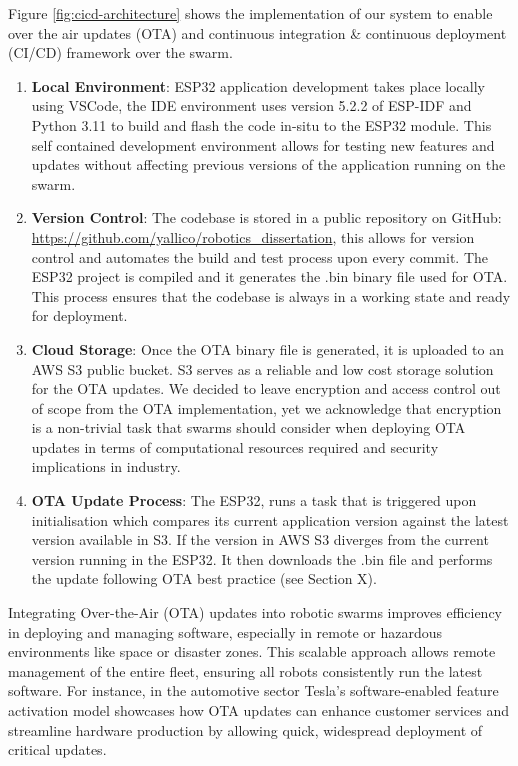 \documentclass[conference]{IEEEtran}
\begin{document}
Figure \ref{fig:cicd-architecture} shows the implementation of our system to enable over the air updates (OTA) and continuous integration \& continuous deployment (CI/CD) framework over the swarm. 
\begin{enumerate}
    \item \textbf{Local Environment}: ESP32 application development takes place locally using VSCode, the IDE environment uses version 5.2.2 of ESP-IDF and Python 3.11 to build and flash the code in-situ to the ESP32 module. This self contained development environment allows for testing new features and updates without affecting previous versions of the application running on the swarm.
    \item \textbf{Version Control}: The codebase is stored in a public repository on GitHub: \url{https://github.com/yallico/robotics_dissertation}, this allows for version control and automates the build and test process upon every commit. The ESP32 project is compiled and it generates the .bin binary file used for OTA. This process ensures that the codebase is always in a working state and ready for deployment.
    \item \textbf{Cloud Storage}: Once the OTA binary file is generated, it is uploaded to an AWS S3 public bucket. S3 serves as a reliable and low cost storage solution for the OTA updates. We decided to leave encryption and access control out of scope from the OTA implementation, yet we acknowledge that encryption is a non-trivial task that swarms should consider when deploying OTA updates in terms of computational resources required and security implications in industry. %
    \item \textbf{OTA Update Process}: The ESP32, runs a task that is triggered upon initialisation which compares its current application version against the latest version available in S3. If the version in AWS S3 diverges from the current version running in the ESP32. It then downloads the .bin file and performs the update following OTA best practice (see Section X). %

\end{enumerate}

Integrating Over-the-Air (OTA) updates into robotic swarms improves efficiency in deploying and managing software, especially in remote or hazardous environments like space or disaster zones. This scalable approach allows remote management of the entire fleet, ensuring all robots consistently run the latest software. For instance, in the automotive sector Tesla's software-enabled feature activation model showcases how OTA updates can enhance customer services and streamline hardware production by allowing quick, widespread deployment of critical updates.\\
\end{document}
